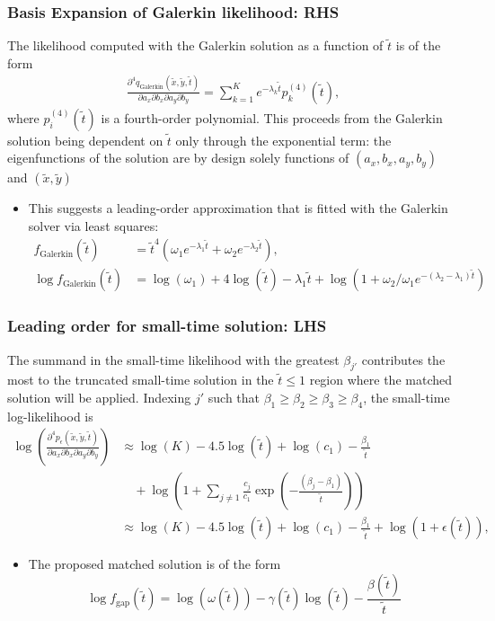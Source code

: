 \documentclass{beamer}
\begin{document}
\begin{frame}
  \frametitle{Basis Expansion of Galerkin likelihood: RHS}
  The likelihood computed with the Galerkin solution as a
function of $\tilde{t}$ is of the form
\begin{align*}
  \frac{\partial^4 q_{\mbox{Galerkin}}(\tilde{x}, \tilde{y}, \tilde{t})}{\partial a_x
  \partial b_x \partial a_y \partial b_y} = \sum_{k=1}^{K} e^{-\lambda_k\tilde{t}} p_k^{(4)}(\tilde{t}),
\end{align*}
where $p_i^{(4)}(\tilde{t})$ is a fourth-order polynomial. This
proceeds from the Galerkin solution being dependent on $\tilde{t}$
only through the exponential term: the eigenfunctions of the solution
are by design solely functions of $(a_x, b_x, a_y, b_y)$ and
$(\tilde{x}, \tilde{y})$


\begin{itemize}
\item This suggests a leading-order approximation that is fitted with the Galerkin solver via least squares:
  \begin{align*}
     f_{\mbox{Galerkin}}(\tilde{t}) &= \tilde{t}^4 \left( \omega_1 e^{-\lambda_1\tilde{t}} + \omega_2 e^{-\lambda_2\tilde{t}}\right), \\
    \log f_{\mbox{Galerkin}}(\tilde{t}) &= \log(\omega_1) + 4 \log(\tilde{t}) -\lambda_1\tilde{t} + \log\left(1 + \omega_2/\omega_1 e^{-(\lambda_2-\lambda_1)\tilde{t}} \right)
  \end{align*}
\end{itemize}
\end{frame}
\begin{frame}
  \frametitle{Leading order for small-time solution: LHS}

  The summand in the small-time likelihood with the greatest
  $\beta_{j'}$ contributes the most to the truncated small-time
  solution in the $\tilde{t} \leq 1$ region where the matched solution
  will be applied. Indexing $j'$ such that
  $\beta_1 \geq \beta_2 \geq \beta_3 \geq \beta_4$, the small-time
  log-likelihood is
\begin{align*}
  \log\left( \frac{\partial^4 p_\epsilon(\tilde{x}, \tilde{y}, \tilde{t})}{\partial a_x
  \partial b_x \partial a_y \partial b_y} \right) &\approx \log(K) - 4.5\log(\tilde{t}) + \log(c_1) - \frac{\beta_1}{\tilde{t}} \nonumber \\
  &\quad + \log\left(1 + \sum_{j \neq 1} \frac{c_j}{c_1}\exp\left( -\frac{(\beta_j-\beta_1)}{\tilde{t}} \right) \right) \nonumber \\
  &\approx \log(K) - 4.5\log(\tilde{t}) + \log(c_1) - \frac{\beta_1}{\tilde{t}} + \log\left(1 + \epsilon(\tilde{t}) \right), 
\end{align*}

  \begin{itemize}
\item The proposed matched solution is of the form
  \[
    \log f_{\mbox{gap}}(\tilde{t}) = \log(\omega(\tilde{t})) -
    \gamma(\tilde{t})\log(\tilde{t}) -
    \frac{\beta(\tilde{t})}{\tilde{t}}
  \]
  \end{itemize}
\end{frame}
\end{document}
